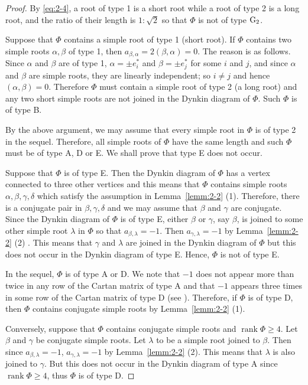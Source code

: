 \documentclass[12pt]{amsart}
\theoremstyle{plain} \numberwithin{equation}{section}
\theoremstyle{definition}
\DeclareMathOperator{\rank}{rank}
\begin{document}
\begin{proof}
By \eqref{eq:2-4}, a root of type 1 is a short root while a root of type 2 is a long root, and the ratio of their length is $1:\sqrt{2}$ so that $\Phi$ is not of type ${\rm G_2}$.   

Suppose that $\Phi$ contains a simple root of type 1 (short root).  If $\Phi$ contains two simple roots $\alpha,\beta$ of type 1, then $a_{\beta,\alpha}=2(\beta,\alpha)=0$.  The reason is as follows.  Since $\alpha$ and $\beta$ are of type 1, $\alpha=\pm e_i^*$ and $\beta=\pm e_j^*$ for some $i$ and $j$, and since $\alpha$ and $\beta$ are simple roots, they are linearly independent; so $i\not=j$ and hence $(\alpha,\beta)=0$.  Therefore $\Phi$ must contain a simple root of type 2 (a long root) and any two short simple roots are not joined in the Dynkin diagram of $\Phi$.  Such $\Phi$ is of type B.  

By the above argument, we may assume that every simple root in $\Phi$ is of type 2 in the sequel. 
Therefore, all simple roots of $\Phi$ have the same length and such $\Phi$ must be of type A, D or E.  We shall prove that type E does not occur.  

Suppose that $\Phi$ is of type E.  Then the Dynkin diagram of $\Phi$ has a vertex connected to three other vertices and this means that $\Phi$ contains simple roots $\alpha,\beta,\gamma,\delta$ which satisfy the assumption in Lemma~\ref{lemm:2-2} (1).  Therefore, there is a conjugate pair in $\beta,\gamma,\delta$ and we may assume that $\beta$ and $\gamma$ are conjugate.  
Since the Dynkin diagram of $\Phi$ is of type E, either $\beta$ or $\gamma$, say $\beta$, is joined to some other simple root $\lambda$ in $\Phi$ so that $a_{\beta,\lambda}=-1$.  Then $a_{\gamma,\lambda}=-1$ by Lemma~\ref{lemm:2-2} (2) . This means that $\gamma$ and $\lambda$ are joined in the Dynkin diagram of $\Phi$ but this does not occur in the Dynkin diagram of type E.  Hence, $\Phi$ is not of type E. 

In the sequel, $\Phi$ is of type A or D.  We note that $-1$ does not appear more than twice in any row of the Cartan matrix of type A and that $-1$ appears three times in some row of the Cartan matrix of type D (see \cite[p.59]{hump72}).  Therefore, if $\Phi$ is of type D, then $\Phi$ contains conjugate simple roots by Lemma~\ref{lemm:2-2} (1). 

Conversely, suppose that $\Phi$ contains conjugate simple roots and $\rank\Phi\ge 4$.  Let $\beta$ and $\gamma$ be conjugate simple roots. Let $\lambda$ to be a simple root joined to $\beta$. Then since $a_{\beta,\lambda}=-1$, $a_{\gamma,\lambda}=-1$ by Lemma~\ref{lemm:2-2} (2).  This means that $\lambda$ is also joined to $\gamma$. But this does not occur in the Dynkin diagram of type A since $\rank\Phi\ge 4$, thus $\Phi$ is of type D. 
\end{proof}
\end{document}
